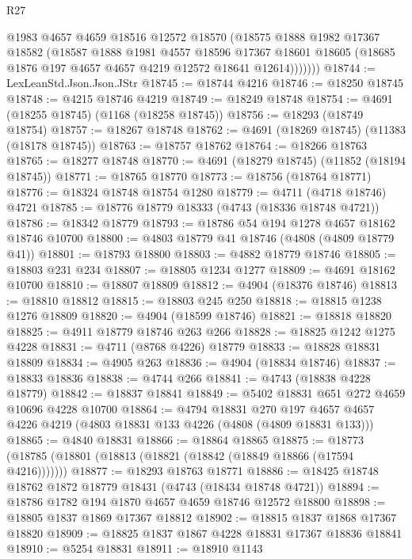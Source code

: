\begin{lexlean}{R27}
\begin{coremodule}
            @1983
            @4657
            @4659
            @18516
            @12572
            @18570
            (@18575
              @1888
              @1982
              @17367
              @18582
              (@18587
                @1888
                @1981
                @4557
                @18596
                @17367
                @18601
                @18605
                (@18685 @1876 @197 @4657 @4657 @4219 @12572 @18641 @12614)))))))
@18744 := LexLeanStd.Json.Json.JStr
@18745 := @18744 @4216
@18746 := @18250 @18745
@18748 := @4215 @18746 @4219
@18749 := @18249 @18748
@18754 := @4691 (@18255 @18745) (@1168 (@18258 @18745))
@18756 := @18293 (@18749 @18754)
@18757 := @18267 @18748
@18762 := @4691 (@18269 @18745) (@11383 (@18178 @18745))
@18763 := @18757 @18762
@18764 := @18266 @18763
@18765 := @18277 @18748
@18770 := @4691 (@18279 @18745) (@11852 (@18194 @18745))
@18771 := @18765 @18770
@18773 := @18756 (@18764 @18771)
@18776 := @18324 @18748 @18754 @1280
@18779 := @4711 (@4718 @18746) @4721
@18785 := @18776 @18779 @18333 (@4743 (@18336 @18748 @4721))
@18786 := @18342 @18779
@18793 := @18786 @54 @194 @1278 @4657 @18162 @18746 @10700
@18800 := @4803 @18779 @41 @18746 (@4808 (@4809 @18779 @41))
@18801 := @18793 @18800
@18803 := @4882 @18779 @18746
@18805 := @18803 @231 @234
@18807 := @18805 @1234 @1277
@18809 := @4691 @18162 @10700
@18810 := @18807 @18809
@18812 := @4904 (@18376 @18746)
@18813 := @18810 @18812
@18815 := @18803 @245 @250
@18818 := @18815 @1238 @1276 @18809
@18820 := @4904 (@18599 @18746)
@18821 := @18818 @18820
@18825 := @4911 @18779 @18746 @263 @266
@18828 := @18825 @1242 @1275 @4228
@18831 := @4711 (@8768 @4226) @18779
@18833 := @18828 @18831 @18809
@18834 := @4905 @263
@18836 := @4904 (@18834 @18746)
@18837 := @18833 @18836
@18838 := @4744 @266
@18841 := @4743 (@18838 @4228 @18779)
@18842 := @18837 @18841
@18849 := @5402 @18831 @651 @272 @4659 @10696 @4228 @10700
@18864 := @4794
    @18831
    @270
    @197
    @4657
    @4657
    @4226
    @4219
    (@4803 @18831 @133 @4226 (@4808 (@4809 @18831 @133)))
@18865 := @4840 @18831
@18866 := @18864 @18865
@18875 := @18773 (@18785 (@18801 (@18813 (@18821 (@18842 (@18849 @18866 (@17594 @4216)))))))
@18877 := @18293 @18763 @18771
@18886 := @18425 @18748 @18762 @1872 @18779 @18431 (@4743 (@18434 @18748 @4721))
@18894 := @18786 @1782 @194 @1870 @4657 @4659 @18746 @12572 @18800
@18898 := @18805 @1837 @1869 @17367 @18812
@18902 := @18815 @1837 @1868 @17367 @18820
@18909 := @18825 @1837 @1867 @4228 @18831 @17367 @18836 @18841
@18910 := @5254 @18831
@18911 := @18910 @1143

\end{coremodule}
\end{lexlean}
